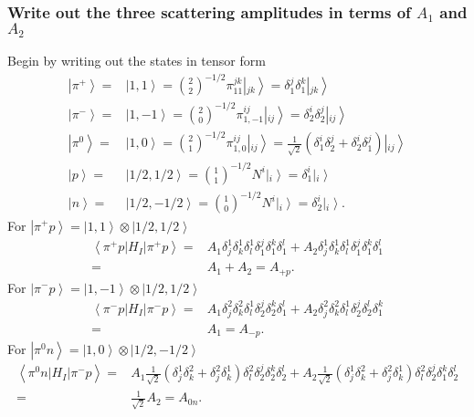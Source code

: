 \documentclass[main.tex]{subfiles}
\begin{document}
\subsubsection{Write out the three scattering amplitudes in terms of $A_1$ and $A_2$}
Begin by writing out the states in tensor form
\begin{align}
\left|\pi^+\right>=&\left|1,1\right>=\binom{2}{2}^{-1/2}\pi_{11}^{jk}\left|_{jk}\right>=\delta_1^j\delta_1^k\left|_{jk}\right>\\
\left|\pi^-\right>=&\left|1,-1\right>=\binom{2}{0}^{-1/2}\pi^{ij}_{1,-1}\left|_{ij}\right>=\delta^i_2\delta^j_2\left|_{ij}\right>\\
\left|\pi^0\right>=&\left|1,0\right>=\binom{2}{1}^{-1/2}\pi^{ij}_{1,0}\left|_{ij}\right>=\frac{1}{\sqrt{2}}(\delta^i_1\delta^j_2+\delta^i_2\delta^j_1)\left|_{ij}\right>\\
\left|p\right>=&\left|1/2,1/2\right>=\binom{1}{1}^{-1/2}N^i\left|_i\right>=\delta^i_1\left|_i\right>\\
\left|n\right>=&\left|1/2,-1/2\right>=\binom{1}{0}^{-1/2}N^i\left|_i\right>=\delta^i_2\left|_i\right>.
\end{align}
For $\left|\pi^+p\right>=\left|1,1\right>\otimes\left|1/2,1/2\right>$
\begin{align}
\left<\pi^+p|H_I|\pi^+p\right>=&A_1\delta^1_j\delta^1_k\delta^1_l\delta^j_1\delta_1^k\delta^l_1+A_2\delta^1_j\delta^1_k\delta^1_l\delta^j_1\delta_1^k\delta^l_1\\
=&A_1+A_2=A_{+p}.
\end{align}
For $\left|\pi^-p\right>=\left|1,-1\right>\otimes\left|1/2,1/2\right>$
\begin{align}
\left<\pi^-p|H_I|\pi^-p\right>=&A_1\delta^2_j\delta^2_k\delta^1_l\delta^j_2\delta_2^k\delta^l_1+A_2\delta^2_j\delta^2_k\delta^1_l\delta^j_2\delta_2^l\delta^k_1\\
=&A_1=A_{-p}.
\end{align}
For $\left|\pi^0n\right>=\left|1,0\right>\otimes\left|1/2,-1/2\right>$
\begin{align}
\left<\pi^0n|H_I|\pi^-p\right>=&A_1\frac{1}{\sqrt{2}}(\delta^1_j\delta^2_k+\delta^2_j\delta^1_k)\delta^2_l\delta^j_2\delta^k_2\delta^l_2+A_2\frac{1}{\sqrt{2}}(\delta^1_j\delta^2_k+\delta^2_j\delta^1_k)\delta^2_l\delta^j_2\delta^k_1\delta^l_2\\
=&\frac{1}{\sqrt{2}}A_2=A_{0n}.
\end{align}
\end{document}

